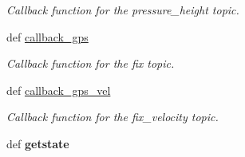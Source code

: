 \begin{DoxyCompactItemize}
\begin{DoxyCompactList}\small\item\em Callback function for the pressure\-\_\-height topic. \end{DoxyCompactList}\item 
\hypertarget{classspiri__api_1_1get__state_1_1_staterobot_a42ec392a4f4512781f3a9c0926fdb175}{def \hyperlink{classspiri__api_1_1get__state_1_1_staterobot_a42ec392a4f4512781f3a9c0926fdb175}{callback\-\_\-gps}}\label{classspiri__api_1_1get__state_1_1_staterobot_a42ec392a4f4512781f3a9c0926fdb175}

\begin{DoxyCompactList}\small\item\em Callback function for the fix topic. \end{DoxyCompactList}\item 
\hypertarget{classspiri__api_1_1get__state_1_1_staterobot_a9a9c3e465592be5e619fe5a68a6563a0}{def \hyperlink{classspiri__api_1_1get__state_1_1_staterobot_a9a9c3e465592be5e619fe5a68a6563a0}{callback\-\_\-gps\-\_\-vel}}\label{classspiri__api_1_1get__state_1_1_staterobot_a9a9c3e465592be5e619fe5a68a6563a0}

\begin{DoxyCompactList}\small\item\em Callback function for the fix\-\_\-velocity topic. \end{DoxyCompactList}\item 
\hypertarget{classspiri__api_1_1get__state_1_1_staterobot_af7dfad7d8aed3e97870fb120b8934a59}{def {\bfseries getstate}}\label{classspiri__api_1_1get__state_1_1_staterobot_af7dfad7d8aed3e97870fb120b8934a59}


\end{DoxyCompactItemize}
